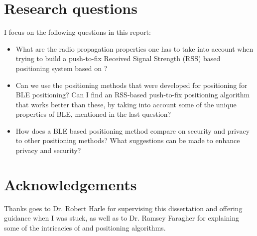 \section{Research questions}
I focus on the following questions in this report:
\begin{itemize}
    \item What are the radio propagation properties one has to take into account when trying to build a push-to-fix Received Signal Strength (RSS) based positioning system based on \BLE?
    \item Can we use the positioning methods that were developed for \wifi positioning for BLE positioning? Can I find an RSS-based push-to-fix positioning algorithm that works better than these, by taking into account some of the unique properties of BLE, mentioned in the last question?
    \item How does a BLE based positioning method compare on security and privacy to other positioning methods? What suggestions can be made to enhance privacy and security?
\end{itemize}

\section{Acknowledgements}
Thanks goes to Dr. Robert Harle for supervising this dissertation and offering guidance when I was stuck, as well as to Dr. Ramsey Faragher for explaining some of the intricacies of \mpp and positioning algorithms.

